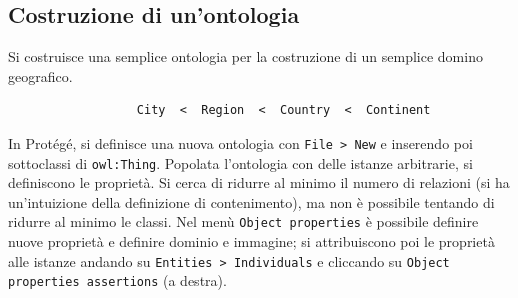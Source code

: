 \documentclass[11pt]{article}
\begin{document}
\subsection*{Costruzione di un'ontologia}
Si costruisce una semplice ontologia per la costruzione di un semplice domino geografico.
\begin{verbatim}
                  City  <  Region  <  Country  <  Continent
\end{verbatim}
In Protégé, si definisce una nuova ontologia con \verb|File > New| e inserendo poi sottoclassi di \verb|owl:Thing|.
Popolata l'ontologia con delle istanze arbitrarie, si definiscono le proprietà.
Si cerca di ridurre al minimo il numero di relazioni (si ha un'intuizione della definizione di contenimento), ma non è possibile tentando di ridurre al minimo le classi.
Nel menù \verb|Object properties| è possibile definire nuove proprietà e definire dominio e immagine; si attribuiscono poi le proprietà alle istanze andando su \verb|Entities > Individuals| e cliccando su \verb|Object properties assertions| (a destra).
\end{document}

